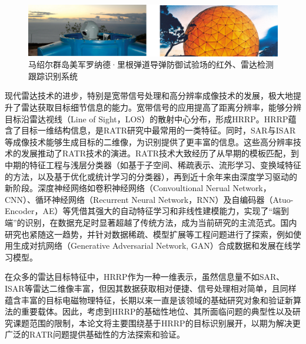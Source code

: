 \begin{figure}[h!]
    \centering
    \includegraphics[width=\linewidth]{figures/reagan.pdf}
    \caption{马绍尔群岛美军罗纳德·里根弹道导弹防御试验场的红外、雷达检测跟踪识别系统}
    \label{fig:hrrp_generation}
\end{figure}

现代雷达技术的进步，特别是宽带信号处理和高分辨率成像技术的发展，极大地提升了雷达获取目标细节信息的能力。宽带信号的应用提高了距离分辨率，能够分辨目标沿雷达视线（Line of Sight，LOS）的散射中心分布，形成HRRP。HRRP蕴含了目标一维结构信息，是RATR研究中最常用的一类特征。同时，SAR与ISAR等成像技术能够生成目标的二维像，为识别提供了更丰富的信息。这些高分辨率技术的发展推动了RATR技术的演进。RATR技术大致经历了从早期的模板匹配，到中期的特征工程与浅层分类器（如基于子空间、稀疏表示、流形学习、变换域特征的方法，以及基于优化或统计学习的分类器），再到近十余年来由深度学习驱动的新阶段。深度神经网络如卷积神经网络（Convoultional Nerual Network，CNN）、循环神经网络（Recurrent Neural Network，RNN）及自编码器（Atuo-Encoder，AE）等凭借其强大的自动特征学习和非线性建模能力，实现了“端到端”的识别，在数据充足时显著超越了传统方法，成为当前研究的主流范式。国内研究也紧随这一趋势，并针对数据稀疏、模型扩展等工程问题进行了探索，例如使用生成对抗网络（Generative Adversarial Network, GAN）合成数据和发展在线学习模型。

在众多的雷达目标特征中，HRRP作为一种一维表示，虽然信息量不如SAR、ISAR等雷达二维像丰富，但因其数据获取相对便捷、信号处理相对简单，且同样蕴含丰富的目标电磁物理特征，长期以来一直是该领域的基础研究对象和验证新算法的重要载体。因此，考虑到HRRP的基础性地位、其所面临问题的典型性以及研究课题范围的限制，本论文将主要围绕基于HRRP的目标识别展开，以期为解决更广泛的RATR问题提供基础性的方法探索和验证。

